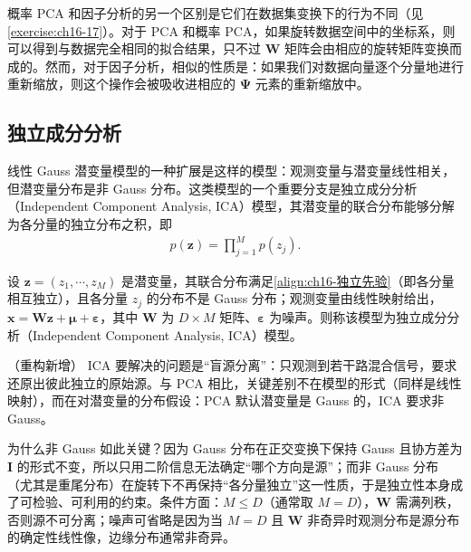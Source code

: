 \documentclass[../../main.tex]{subfiles}
\begin{document}
概率 PCA 和因子分析的另一个区别是它们在数据集变换下的行为不同（见\cref{exercise:ch16-17}）。对于 PCA 和概率 PCA，如果旋转数据空间中的坐标系，则可以得到与数据完全相同的拟合结果，只不过 $\bm{W}$ 矩阵会由相应的旋转矩阵变换而成的。然而，对于因子分析，相似的性质是：如果我们对数据向量逐个分量地进行重新缩放，则这个操作会被吸收进相应的 $\bm{\Psi}$ 元素的重新缩放中。

\subsection{独立成分分析}\label{subsection:ch16-独立成分分析}

线性 Gauss 潜变量模型的一种扩展是这样的模型：观测变量与潜变量线性相关，但潜变量分布是非 Gauss 分布。这类模型的一个重要分支是独立成分分析（Independent Component Analysis, ICA）模型，其潜变量的联合分布能够分解为各分量的独立分布之积，即
\begin{align}
  p(\bm{z})=\prod_{j=1}^{M}p(z_j).
  \label{align:ch16-独立先验}
\end{align}

\begin{definition}[独立成分分析]\label{definition:ch16-独立成分分析}
设 $\bm{z}=(z_1,\cdots,z_M)$ 是潜变量，其联合分布满足\eqref{align:ch16-独立先验}（即各分量相互独立），且各分量 $z_j$ 的分布不是 Gauss 分布；观测变量由线性映射给出，$\bm{x}=\bm{W}\bm{z}+\bm{\mu}+\bm{\varepsilon}$，其中 $\bm{W}$ 为 $D\times M$ 矩阵、$\bm{\varepsilon}$ 为噪声。则称该模型为独立成分分析（Independent Component Analysis, ICA）模型。
\end{definition}

\begin{remark}（重构新增）
ICA 要解决的问题是“盲源分离”：只观测到若干路混合信号，要求还原出彼此独立的原始源。与 PCA 相比，关键差别不在模型的形式（同样是线性映射），而在对潜变量的分布假设：PCA 默认潜变量是 Gauss 的，ICA 要求非 Gauss。

为什么非 Gauss 如此关键？因为 Gauss 分布在正交变换下保持 Gauss 且协方差为 $\bm{I}$ 的形式不变，所以只用二阶信息无法确定“哪个方向是源”；而非 Gauss 分布（尤其是重尾分布）在旋转下不再保持“各分量独立”这一性质，于是独立性本身成了可检验、可利用的约束。条件方面：$M\leqslant D$（通常取 $M=D$），$\bm{W}$ 需满列秩，否则源不可分离；噪声可省略是因为当 $M=D$ 且 $\bm{W}$ 非奇异时观测分布是源分布的确定性线性像，边缘分布通常非奇异。
\end{remark}
\end{document}
